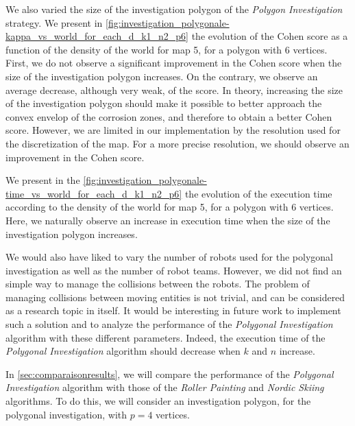 We also varied the size of the investigation polygon of the \textit{Polygon Investigation} strategy.
We present in \ref{fig:investigation_polygonale-kappa_vs_world_for_each_d_k1_n2_p6} the evolution of the Cohen score as a function of the density of the world for map 5, for a polygon with 6 vertices.
First, we do not observe a significant improvement in the Cohen score when the size of the investigation polygon increases.
On the contrary, we observe an average decrease, although very weak, of the score.
In theory, increasing the size of the investigation polygon should make it possible to better approach the convex envelop of the corrosion zones, and therefore to obtain a better Cohen score.
However, we are limited in our implementation by the resolution used for the discretization of the map.
For a more precise resolution, we should observe an improvement in the Cohen score.

We present in the \ref{fig:investigation_polygonale-time_vs_world_for_each_d_k1_n2_p6} the evolution of the execution time according to the density of the world for map 5, for a polygon with 6 vertices.
Here, we naturally observe an increase in execution time when the size of the investigation polygon increases.

We would also have liked to vary the number of robots used for the polygonal investigation as well as the number of robot teams.
However, we did not find an simple way to manage the collisions between the robots.
The problem of managing collisions between moving entities is not trivial, and can be considered as a research topic in itself.
It would be interesting in future work to implement such a solution and to analyze the performance of the \textit{Polygonal Investigation} algorithm with these different parameters.
Indeed, the execution time of the \textit{Polygonal Investigation} algorithm should decrease when $k$ and $n$ increase.

In \ref{sec:comparaisonresults}, we will compare the performance of the \textit{Polygonal Investigation} algorithm with those of the \textit{Roller Painting} and \textit{Nordic Skiing} algorithms.
To do this, we will consider an investigation polygon, for the polygonal investigation, with $p = 4$ vertices.

